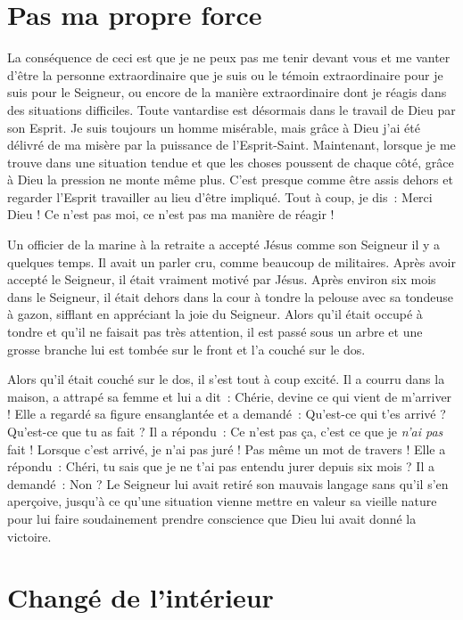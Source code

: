 \section*{Pas ma propre force}

La conséquence de ceci est que je ne peux pas me tenir devant vous
 et me vanter d'être la personne extraordinaire que je suis
 ou le témoin extraordinaire pour je suis pour le Seigneur,
 ou encore de la manière extraordinaire dont je réagis dans des
 situations difficiles.
 Toute vantardise est désormais dans le travail de Dieu par son Esprit.
 Je suis toujours un homme misérable, mais grâce à Dieu
 j'ai été délivré de ma misère par la puissance de l'Esprit-Saint.
 Maintenant, lorsque je me trouve dans une situation tendue
 et que les choses poussent de chaque côté, grâce à Dieu la pression
 ne monte même plus.
 C'est presque comme être assis dehors et regarder l'Esprit travailler
 au lieu d'être impliqué.
 Tout à coup, je dis~:
 \og Merci Dieu ! Ce n'est pas moi,
 ce n'est pas ma manière de réagir ! \fg{}

Un officier de la marine à la retraite a accepté Jésus comme son Seigneur
 il y a quelques temps.
 Il avait un parler cru, comme beaucoup de militaires.
 Après avoir accepté le Seigneur, il était vraiment motivé par Jésus.
 Après environ six mois dans le Seigneur, il était dehors dans la cour
 à tondre la pelouse avec sa tondeuse à gazon, sifflant en appréciant
 la joie du Seigneur.
 Alors qu'il était occupé à tondre et qu'il ne faisait pas très attention,
 il est passé sous un arbre et une grosse branche lui est tombée sur le front
 et l'a couché sur le dos.

Alors qu'il était couché sur le dos, il s'est tout à coup excité.
 Il a courru dans la maison, a attrapé sa femme et lui a dit~:
 \og Chérie, devine ce qui vient de m'arriver ! \fg{}
 Elle a regardé sa figure ensanglantée et a demandé~:
 \og Qu'est-ce qui t'es arrivé ? Qu'est-ce que tu as fait ? \fg{}
 Il a répondu~:
 \og Ce n'est pas ça, c'est ce que je \emph{n'ai pas} fait !
 Lorsque c'est arrivé, je n'ai pas juré ! Pas même un mot de travers ! \fg{}
 Elle a répondu~:
 \og Chéri, tu sais que je ne t'ai pas entendu jurer depuis six mois ? \fg{}
 Il a demandé~: \og Non ? \fg{}
 Le Seigneur lui avait retiré son mauvais langage sans qu'il s'en aperçoive,
 jusqu'à ce qu'une situation vienne mettre en valeur sa vieille nature
 pour lui faire soudainement prendre conscience
 que Dieu lui avait donné la victoire.


\section*{Changé de l'intérieur}

